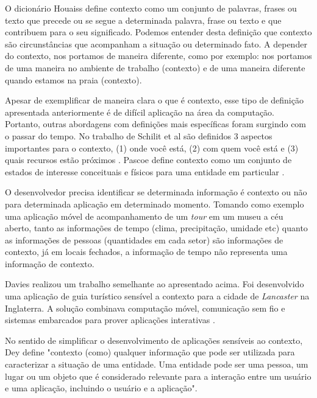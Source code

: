 O dicionário Houaiss define contexto como um conjunto de palavras, frases ou
texto que precede ou se segue a determinada palavra, frase ou texto e que
contribuem para o seu significado. Podemos entender desta definição que contexto
são circunstâncias que acompanham a situação ou determinado fato. A depender do
contexto, nos portamos de maneira diferente, como por exemplo: nos portamos de
uma maneira no ambiente de trabalho (contexto) e de uma maneira diferente quando
estamos na praia (contexto).


Apesar de exemplificar de maneira clara o que é contexto, esse tipo de definição
apresentada anteriormente é de difícil aplicação na área da computação.
Portanto, outras abordagens com definições mais específicas foram surgindo com o
passar do tempo. No trabalho de Schilit et al são definidos 3 aspectos
importantes para o contexto, (1) onde você está, (2) com quem você está e (3)
quais recursos estão próximos \cite{schilit1994context}. Pascoe define contexto 
como um conjunto de estados de interesse conceituais e físicos para uma entidade 
em particular \cite{pascoe1998adding}.

O desenvolvedor precisa identificar se determinada informação é contexto ou não
para determinada aplicação em determinado momento. Tomando como exemplo uma
aplicação móvel de acompanhamento de um \textit{tour} em um museu a céu aberto, 
tanto as informações de tempo (clima, precipitação, umidade etc) quanto as 
informações de pessoas (quantidades em cada setor) são informações de contexto, 
já em locais fechados, a informação de tempo não representa uma informação de 
contexto.

Davies realizou um trabalho semelhante ao apresentado acima. Foi 
desenvolvido uma aplicação de guia turístico sensível a contexto para a cidade 
de \textit{Lancaster} na Inglaterra. A solução combinava computação móvel, 
comunicação sem fio e sistemas embarcados para prover aplicações interativas
\cite{davies1999caches}.

No sentido de simplificar o desenvolvimento de aplicações sensíveis ao contexto,
Dey define "contexto (como) qualquer informação que pode ser utilizada para
caracterizar a situação de uma entidade. Uma entidade pode ser uma pessoa, um
lugar ou um objeto que é considerado relevante para a interação entre um usuário
e uma aplicação, incluindo o usuário e a aplicação".

